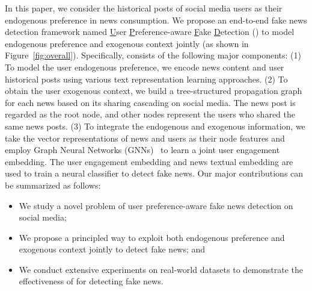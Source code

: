\documentclass[sigconf]{acmart}
\newcommand\UPFD{\xspace}
\begin{document}
In this paper, we consider the historical posts of social media users as their endogenous preference in news consumption.
We propose an end-to-end fake news detection framework named \underline{U}ser \underline{P}reference-aware \underline{F}ake \underline{D}etection (\UPFD) to model endogenous preference and exogenous context jointly (as shown in Figure~\ref{fig:overall}).
Specifically, \UPFD consists of the following major components: 
(1) To model the user endogenous preference, we encode news content and user historical posts using various text representation learning approaches.
(2) To obtain the user exogenous context, we build a tree-structured propagation graph for each news based on its sharing cascading on social media.
The news post is regarded as the root node, and other nodes represent the users who shared the same news posts.
(3) To integrate the endogenous and exogenous information, we take the vector representations of news and users as their node features and employ Graph Neural Networks (GNNs)~\cite{hamilton2017inductive, monti2019fake} to learn a joint user engagement embedding.
The user engagement embedding and news textual embedding are used to train a neural classifier to detect fake news.
Our major contributions can be summarized as follows:
\begin{itemize}[leftmargin=*]
    \item We study a novel problem of user preference-aware fake news detection on social media;
    \item We propose a principled way to exploit both endogenous preference and exogenous context jointly to detect fake news; and
    \item We conduct extensive experiments on real-world datasets to demonstrate the effectiveness of \UPFD for detecting fake news.
\end{itemize}
\end{document}
